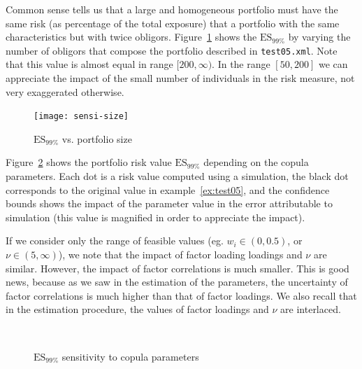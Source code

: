 \documentclass[11pt,fleqn]{book} %
\begin{document}
\begin{example}
	Common sense tells us that a large and homogeneous portfolio must have the 
	same risk (as percentage of the total exposure) that a portfolio with the 
	same characteristics but with twice obligors. Figure~\ref{fig:sensi1}
	shows the $\text{ES}_{99\%}$ by varying the number of obligors that 
	compose the portfolio described in \texttt{test05.xml}. Note that this
	value is almost equal in range $[200,\infty)$. In the range $[50,200]$
	we can appreciate the impact of the small number of individuals in the 
	risk measure, not very exaggerated otherwise.
\end{example}

\begin{figure}[!ht]
	\centering
	\texttt{[image: sensi-size]}
	\caption{$\text{ES}_{99\%}$ vs. portfolio size}
	\label{fig:sensi1}
\end{figure}

\begin{example}
	Figure~\ref{fig:sensi2} shows the portfolio risk value $\text{ES}_{99\%}$ 
	depending on the copula parameters. Each dot is a 
	risk value computed using a simulation, the black dot corresponds to the 
	original value in example~\ref{ex:test05}, and the confidence bounds shows 
	the impact of the parameter value in the error attributable to simulation 
	(this value is magnified in order to appreciate the impact).
	
	If we consider only the range of feasible values (eg. $w_i \in (0,0.5)$, or
	$\nu \in (5,\infty)$), we note that the impact of factor loading loadings
	and $\nu$ are similar. However, the impact of factor correlations is much 
	smaller. This is good news, because as we saw in the estimation of the 
	parameters, the uncertainty of factor correlations is much higher than 
	that of factor loadings. We also recall that in the estimation procedure,
	the values of factor loadings and $\nu$ are interlaced. 
\end{example}

\begin{figure}[!h]
	\centering
	\\
	\caption{$\text{ES}_{99\%}$ sensitivity to copula parameters}
	\label{fig:sensi2}
\end{figure}
\end{document}
